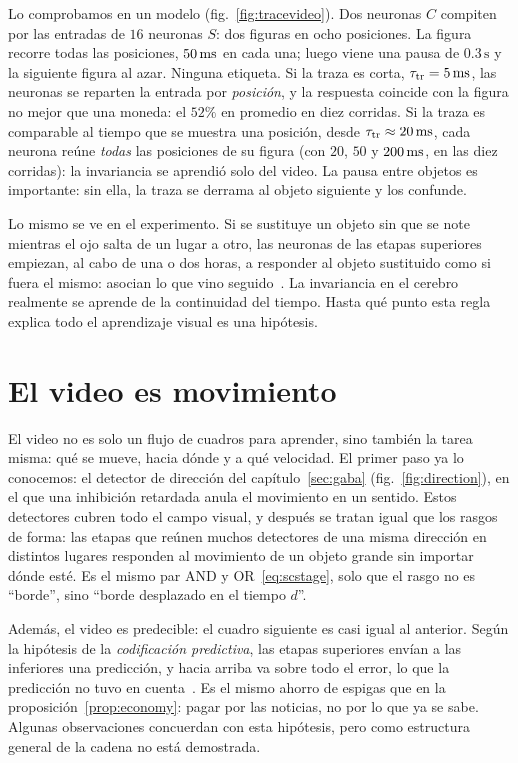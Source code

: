 Lo comprobamos en un modelo (fig.~\ref{fig:tracevideo}). Dos neuronas $C$ compiten por las entradas de $16$ neuronas $S$: dos figuras en ocho posiciones. La figura recorre todas las posiciones, $50\,\text{ms}$ en cada una; luego viene una pausa de $0.3\,\text{s}$ y la siguiente figura al azar. Ninguna etiqueta. Si la traza es corta, $\tau_{\text{tr}}=5\,\text{ms}$, las neuronas se reparten la entrada por \emph{posición}, y la respuesta coincide con la figura no mejor que una moneda: el $52\%$ en promedio en diez corridas. Si la traza es comparable al tiempo que se muestra una posición, desde $\tau_{\text{tr}}\approx20\,\text{ms}$, cada neurona reúne \emph{todas} las posiciones de su figura (con $20$, $50$ y $200\,\text{ms}$, en las diez corridas): la invariancia se aprendió solo del video. La pausa entre objetos es importante: sin ella, la traza se derrama al objeto siguiente y los confunde.

Lo mismo se ve en el experimento. Si se sustituye un objeto sin que se note mientras el ojo salta de un lugar a otro, las neuronas de las etapas superiores empiezan, al cabo de una o dos horas, a responder al objeto sustituido como si fuera el mismo: asocian lo que vino seguido~\cite{LiDiCarlo2008}. La invariancia en el cerebro realmente se aprende de la continuidad del tiempo. Hasta qué punto esta regla explica todo el aprendizaje visual es una hipótesis.

\section{El video es movimiento}

El video no es solo un flujo de cuadros para aprender, sino también la tarea misma: qué se mueve, hacia dónde y a qué velocidad. El primer paso ya lo conocemos: el detector de dirección del capítulo~\ref{sec:gaba} (fig.~\ref{fig:direction}), en el que una inhibición retardada anula el movimiento en un sentido. Estos detectores cubren todo el campo visual, y después se tratan igual que los rasgos de forma: las etapas que reúnen muchos detectores de una misma dirección en distintos lugares responden al movimiento de un objeto grande sin importar dónde esté. Es el mismo par AND y OR~\eqref{eq:scstage}, solo que el rasgo no es “borde”, sino “borde desplazado en el tiempo $d$”.

Además, el video es predecible: el cuadro siguiente es casi igual al anterior. Según la hipótesis de la \emph{codificación predictiva}, las etapas superiores envían a las inferiores una predicción, y hacia arriba va sobre todo el error, lo que la predicción no tuvo en cuenta~\cite{RaoBallard1999}. Es el mismo ahorro de espigas que en la proposición~\ref{prop:economy}: pagar por las noticias, no por lo que ya se sabe. Algunas observaciones concuerdan con esta hipótesis, pero como estructura general de la cadena no está demostrada.

